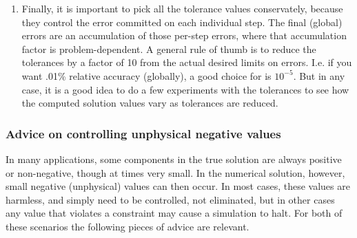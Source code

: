 \documentclass[letterpaper,10pt,english]{sphinxmanual}
\begin{document}
\begin{enumerate}
\item {} 
Finally, it is important to pick all the tolerance values
conservately, because they control the error committed on each
individual step. The final (global) errors are an accumulation of
those per-step errors, where that accumulation factor is
problem-dependent.  A general rule of thumb is to reduce the
tolerances by a factor of 10 from the actual desired limits on
errors.  I.e. if you want .01\% relative accuracy (globally), a good
choice for  is $10^{-5}$.  But in any case, it is
a good idea to do a few experiments with the tolerances to see how
the computed solution values vary as tolerances are reduced.

\end{enumerate}


\subsubsection{Advice on controlling unphysical negative values}
\label{c_interface/User_callable:advice-on-controlling-unphysical-negative-values}
In many applications, some components in the true solution are always
positive or non-negative, though at times very small.  In the
numerical solution, however, small negative (unphysical) values
can then occur. In most cases, these values are harmless, and simply
need to be controlled, not eliminated, but in other cases any value
that violates a constraint may cause a simulation to halt. For both of
these scenarios the following pieces of advice are relevant.
\end{document}
